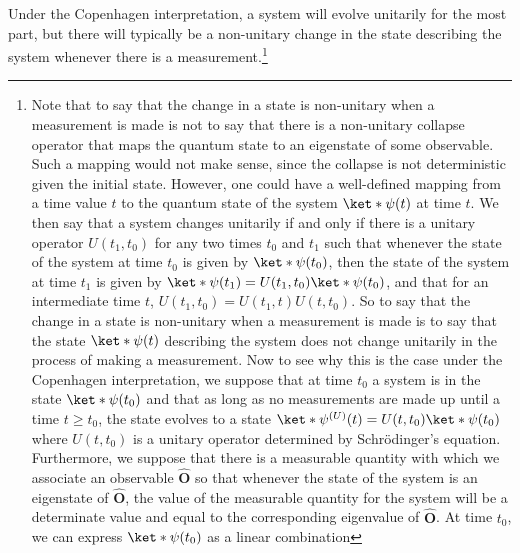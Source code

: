 \documentclass[12pt]{report}
\begin{document}
Under the Copenhagen interpretation, a system will evolve unitarily for the most part, but there will typically be a non-unitary change in the state describing the system whenever there is a measurement.\footnote{Note that to say that the change in a state is non-unitary when a measurement is made is not to say that there is a non-unitary collapse operator that maps the quantum state to an eigenstate of some observable. Such a mapping would not make sense, since the collapse is not deterministic given the initial state. However, one could have a well-defined mapping from a time value $t$ to the quantum state of the system $\ket*{\psi(t)}$ %
%
 at time $t$. We then say that a system changes unitarily if and only if there is a unitary operator $U(t_1,t_0)$ for any two times $t_0$ and $t_1$ such that whenever the state of the system at time $t_0$ is given by $\ket*{\psi(t_0)}$, then the state of the system at time $t_1$ is given by $\ket*{\psi(t_1)}=U(t_1, t_0)\ket*{\psi(t_0)}$, and that for an intermediate time $t$, $U(t_1,t_0)=U(t_1, t)U(t, t_0).$ So to say that the change in a state is non-unitary when a measurement is made is to say that the state $\ket*{\psi(t)}$ describing the system does not change unitarily in the process of making a measurement. Now to see why this is the case under the Copenhagen interpretation, we suppose that at time $t_0$ a system is in the state $\ket*{\psi(t_0)}$ and that as long as no measurements are made up until a time $t\geq t_0$, the state evolves to a state $\ket*{\psi^{(U)}(t)}=U(t,t_0)\ket*{\psi(t_0)}$  %
%
 where $U(t,t_0)$ is a unitary operator determined by Schr\"{o}dinger's equation. Furthermore, we suppose that there is a measurable quantity with which we associate an observable $\hat{\bm{O}}$ so that whenever the state of the system is an eigenstate of $\hat{\bm{O}}$, the value of the measurable quantity for the system will be a determinate value and equal to the corresponding eigenvalue of $\hat{\bm{O}}$. At time $t_0$, we can express $\ket*{\psi(t_0)}$ as a linear combination
}
\end{document}
